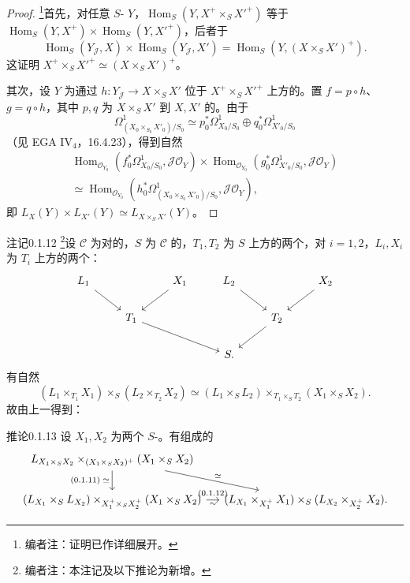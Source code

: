 \begin{proof}
\footnote{编者注：证明已作详细展开。}首先，对任意 $S$- $Y$，$\operatorname{Hom}_S(Y,X^+\times_S X'^+)$ 等于 $\operatorname{Hom}_S(Y,X^+)\times\operatorname{Hom}_S(Y,X'^+)$，后者于
\[\operatorname{Hom}_S(Y_{\mathcal J},X)\times\operatorname{Hom}_S(Y_{\mathcal J},X')=\operatorname{Hom}_S(Y,(X\times_S X')^+).\]
这证明 $X^+\times_S X'^+\simeq(X\times_S X')^+$。

其次，设 $Y$ 为通过 $h:Y_{\mathcal J}\to X\times_S X'$ 位于 $X^+\times_S X'^+$ 上方的。置 $f=p\circ h$、$g=q\circ h$，其中 $p,q$ 为 $X\times_S X'$ 到 $X,X'$ 的。由于
\[\Omega^1_{(X_0\times_{S_0}X'_0)/S_0}\simeq p_0^*\Omega^1_{X_0/S_0}\oplus q_0^*\Omega^1_{X'_0/S_0}\]
（见 EGA IV$_4$，16.4.23），得到自然
\[\begin{aligned}
\operatorname{Hom}_{\mathcal O_{Y_0}}(f_0^*\Omega^1_{X_0/S_0},\mathcal J\mathcal O_Y)\times\operatorname{Hom}_{\mathcal O_{Y_0}}(g_0^*\Omega^1_{X'_0/S_0},\mathcal J\mathcal O_Y)\\
\simeq\operatorname{Hom}_{\mathcal O_{Y_0}}(h_0^*\Omega^1_{(X_0\times_{S_0}X'_0)/S_0},\mathcal J\mathcal O_Y),
\end{aligned}\]
即 $L_X(Y)\times L_{X'}(Y)\simeq L_{X\times_S X'}(Y)$。
\end{proof}
\begin{SGAresult}{注记}{0.1.12}
\footnote{编者注：本注记及以下推论为新增。}设 $\mathscr C$ 为对的，$S$ 为 $\mathscr C$ 的，$T_1,T_2$ 为 $S$ 上方的两个，对 $i=1,2$，$L_i,X_i$ 为 $T_i$ 上方的两个：
\[\begin{tikzcd}L_1\arrow[dr]& &X_1\arrow[dl]&L_2\arrow[dr]&&X_2\arrow[dl]\\&T_1\arrow[drr]&&&T_2\arrow[dl]\\&&&S.\end{tikzcd}\]
有自然
\[(L_1\times_{T_1}X_1)\times_S(L_2\times_{T_2}X_2)\simeq(L_1\times_S L_2)\times_{T_1\times_S T_2}(X_1\times_S X_2).\]
故由上一得到：
\end{SGAresult}
\begin{SGAresult}{推论}{0.1.13}
设 $X_1,X_2$ 为两个 $S$-。有组成的
\[\begin{tikzcd}[column sep=small]
L_{X_1\times_S X_2}\times_{(X_1\times_S X_2)^+}(X_1\times_S X_2)\arrow[d,"(0.1.11)\;\simeq"']\arrow[dr,"\simeq"]&\\
(L_{X_1}\times_S L_{X_2})\times_{X_1^+\times_S X_2^+}(X_1\times_S X_2)\arrow[r,"\sim"',"(0.1.12)"]&(L_{X_1}\times_{X_1^+}X_1)\times_S(L_{X_2}\times_{X_2^+}X_2).
\end{tikzcd}\]
\end{SGAresult}
